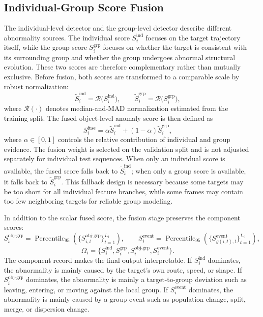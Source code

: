 \subsection{Individual-Group Score Fusion}
The individual-level detector and the group-level detector describe different abnormality sources. The individual score \(S_i^{\mathrm{ind}}\) focuses on the target trajectory itself, while the group score \(S_i^{\mathrm{grp}}\) focuses on whether the target is consistent with its surrounding group and whether the group undergoes abnormal structural evolution. These two scores are therefore complementary rather than mutually exclusive. Before fusion, both scores are transformed to a comparable scale by robust normalization:
\begin{equation}
  \tilde{S}_i^{\mathrm{ind}}
  =
  \mathcal{R}\big(S_i^{\mathrm{ind}}\big),\qquad
  \tilde{S}_i^{\mathrm{grp}}
  =
  \mathcal{R}\big(S_i^{\mathrm{grp}}\big),
\end{equation}
where \(\mathcal{R}(\cdot)\) denotes median-and-MAD normalization estimated from the training split. The fused object-level anomaly score is then defined as
\begin{equation}
  S_i^{\mathrm{fuse}}
  =
  \alpha \tilde{S}_i^{\mathrm{ind}}
  +
  (1-\alpha)\tilde{S}_i^{\mathrm{grp}},
\end{equation}
where \(\alpha\in[0,1]\) controls the relative contribution of individual and group evidence. The fusion weight is selected on the validation split and is not adjusted separately for individual test sequences. When only an individual score is available, the fused score falls back to \(\tilde{S}_i^{\mathrm{ind}}\); when only a group score is available, it falls back to \(\tilde{S}_i^{\mathrm{grp}}\). This fallback design is necessary because some targets may be too short for all individual feature branches, while some frames may contain too few neighboring targets for reliable group modeling.

In addition to the scalar fused score, the fusion stage preserves the component scores:
\begin{equation}
  S_i^{\mathrm{obj\mbox{-}grp}}
  =
  \operatorname{Percentile}_{95}
  \left(\{S_{i,t}^{\mathrm{obj\mbox{-}grp}}\}_{t=1}^{L_i}\right),
  \qquad
  S_i^{\mathrm{event}}
  =
  \operatorname{Percentile}_{95}
  \left(\{S_{g(i,t),t}^{\mathrm{event}}\}_{t=1}^{L_i}\right),
\end{equation}
\begin{equation}
  \Omega_i=
  \{S_i^{\mathrm{ind}},S_i^{\mathrm{grp}},
  S_i^{\mathrm{obj\mbox{-}grp}},S_i^{\mathrm{event}}\}.
\end{equation}
The component record makes the final output interpretable. If \(S_i^{\mathrm{ind}}\) dominates, the abnormality is mainly caused by the target's own route, speed, or shape. If \(S_i^{\mathrm{obj\mbox{-}grp}}\) dominates, the abnormality is mainly a target-to-group deviation such as leaving, entering, or moving against the local group. If \(S_i^{\mathrm{event}}\) dominates, the abnormality is mainly caused by a group event such as population change, split, merge, or dispersion change.

